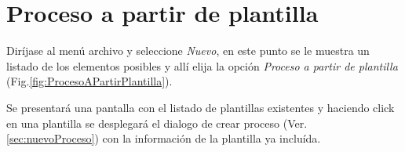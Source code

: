 \section{Proceso a partir de plantilla}
\label{sec:procesoPlantilla}

Dir\'ijase al men\'u archivo y seleccione \emph{Nuevo}, en este punto se le muestra un listado de los elementos posibles y
all\'i elija la opci\'on \emph{Proceso a partir de plantilla} (Fig.\ref{fig:ProcesoAPartirPlantilla}). 


Se presentar\'a una pantalla con el listado de plantillas existentes y haciendo
click en una plantilla se desplegar\'a el dialogo de crear proceso (Ver.
\ref{sec:nuevoProceso}) con la informaci\'on de la plantilla ya inclu\'ida.